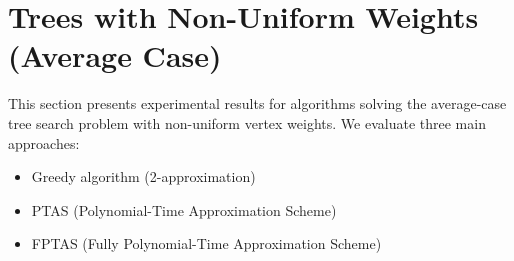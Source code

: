 \newpage
\section{Trees with Non-Uniform Weights (Average Case)}

This section presents experimental results for algorithms solving the average-case tree search problem with non-uniform vertex weights. We evaluate three main approaches:
\begin{itemize}
    \item Greedy algorithm (2-approximation)
    \item PTAS (Polynomial-Time Approximation Scheme)
    \item FPTAS (Fully Polynomial-Time Approximation Scheme)
\end{itemize}

















